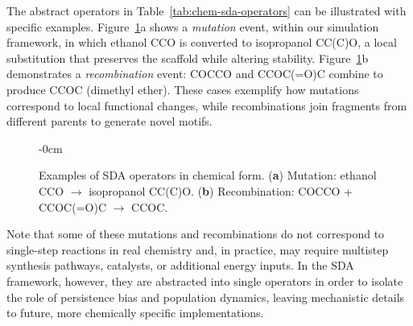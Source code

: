 \documentclass[life,article,submit,pdftex,moreauthors]{Definitions/mdpi}
\begin{document}
The abstract operators in Table~\ref{tab:chem-sda-operators} can be illustrated with specific examples. 
Figure~\ref{fig:mutation-recombination}a shows a \textit{mutation} event, within our
simulation framework, in which ethanol CCO is converted to isopropanol CC(C)O, 
a local substitution that preserves the scaffold while altering stability. 
Figure~\ref{fig:mutation-recombination}b demonstrates a \textit{recombination} event: 
COCCO and CCOC(=O)C combine to produce CCOC (dimethyl ether). 
These cases exemplify how mutations correspond to local functional changes, 
while recombinations join fragments from different parents to generate novel motifs. 


\begin{figure}[H]
\begin{adjustwidth}{-\extralength}{0cm}
\centering
{}
\hspace{0.4cm}
\end{adjustwidth}
\caption{Examples of SDA operators in chemical form. (\textbf{a}) Mutation: ethanol CCO $\to$ isopropanol CC(C)O. 
(\textbf{b}) Recombination: COCCO + CCOC(=O)C $\to$ CCOC.}
\label{fig:mutation-recombination}
\end{figure}

Note that some of these mutations and recombinations do not correspond to single-step reactions in real chemistry and, in practice, may require multistep synthesis pathways, catalysts, or additional energy inputs. In the SDA framework, however, they are abstracted into single operators in order to isolate the role of persistence bias and population dynamics, leaving mechanistic details to future, more chemically specific implementations.
\end{document}

